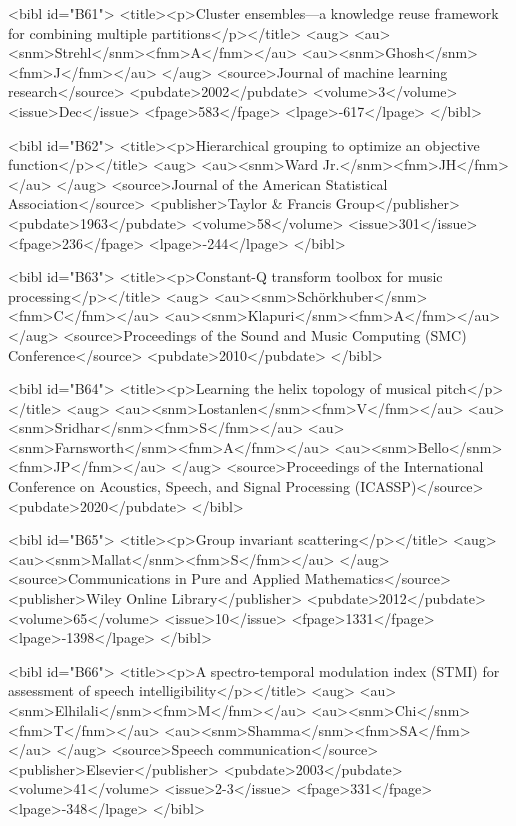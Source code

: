 \documentclass{bmcart}
\begin{document}
\begin{backmatter}
{<bibl id="B61">
  <title><p>Cluster ensembles---a knowledge reuse framework for combining
  multiple partitions</p></title>
  <aug>
    <au><snm>Strehl</snm><fnm>A</fnm></au>
    <au><snm>Ghosh</snm><fnm>J</fnm></au>
  </aug>
  <source>Journal of machine learning research</source>
  <pubdate>2002</pubdate>
  <volume>3</volume>
  <issue>Dec</issue>
  <fpage>583</fpage>
  <lpage>-617</lpage>
</bibl>

<bibl id="B62">
  <title><p>Hierarchical grouping to optimize an objective function</p></title>
  <aug>
    <au><snm>Ward Jr.</snm><fnm>JH</fnm></au>
  </aug>
  <source>Journal of the American Statistical Association</source>
  <publisher>Taylor \& Francis Group</publisher>
  <pubdate>1963</pubdate>
  <volume>58</volume>
  <issue>301</issue>
  <fpage>236</fpage>
  <lpage>-244</lpage>
</bibl>

<bibl id="B63">
  <title><p>Constant-Q transform toolbox for music processing</p></title>
  <aug>
    <au><snm>Sch{\"o}rkhuber</snm><fnm>C</fnm></au>
    <au><snm>Klapuri</snm><fnm>A</fnm></au>
  </aug>
  <source>Proceedings of the Sound and Music Computing (SMC)
  Conference</source>
  <pubdate>2010</pubdate>
</bibl>

<bibl id="B64">
  <title><p>Learning the helix topology of musical pitch</p></title>
  <aug>
    <au><snm>Lostanlen</snm><fnm>V</fnm></au>
    <au><snm>Sridhar</snm><fnm>S</fnm></au>
    <au><snm>Farnsworth</snm><fnm>A</fnm></au>
    <au><snm>Bello</snm><fnm>JP</fnm></au>
  </aug>
  <source>Proceedings of the International Conference on Acoustics, Speech, and
  Signal Processing (ICASSP)</source>
  <pubdate>2020</pubdate>
</bibl>

<bibl id="B65">
  <title><p>Group invariant scattering</p></title>
  <aug>
    <au><snm>Mallat</snm><fnm>S</fnm></au>
  </aug>
  <source>Communications in Pure and Applied Mathematics</source>
  <publisher>Wiley Online Library</publisher>
  <pubdate>2012</pubdate>
  <volume>65</volume>
  <issue>10</issue>
  <fpage>1331</fpage>
  <lpage>-1398</lpage>
</bibl>

<bibl id="B66">
  <title><p>A spectro-temporal modulation index (STMI) for assessment of speech
  intelligibility</p></title>
  <aug>
    <au><snm>Elhilali</snm><fnm>M</fnm></au>
    <au><snm>Chi</snm><fnm>T</fnm></au>
    <au><snm>Shamma</snm><fnm>SA</fnm></au>
  </aug>
  <source>Speech communication</source>
  <publisher>Elsevier</publisher>
  <pubdate>2003</pubdate>
  <volume>41</volume>
  <issue>2-3</issue>
  <fpage>331</fpage>
  <lpage>-348</lpage>
</bibl>

}
\end{backmatter}
\end{document}
